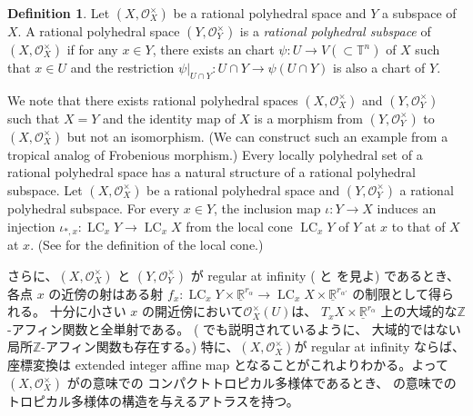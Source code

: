 \documentclass[a4paper,dvipdfmx,reqno,12pt]{amsart}
\theoremstyle{definition}
\newtheorem{definition}[theorem]{Definition}
\newcommand{\opn}[1]{\operatorname{#1}}
\numberwithin{equation}{section}
\begin{document}
\begin{definition}
Let 
$(X,\mathcal{O}_X^{\times})$ be a rational polyhedral space
and $Y$ a subspace of $X$.
A rational polyhedral space $(Y,\mathcal{O}_Y^{\times})$ is 
a \emph{rational polyhedral subspace} of
$(X,\mathcal{O}_X^{\times})$ if 
for any $x\in Y$, there exists an chart
$\psi \colon U \to V (\subset \mathbb{T}^{n})$
of $X$
such that $x\in U$ and the restriction
$\psi|_{U\cap Y}\colon U\cap Y\to 
\psi(U\cap Y)$ is also a chart of $Y$.
\end{definition}
We note that there exists rational polyhedral spaces
$(X,\mathcal{O}_X^{\times})$
and $(Y,\mathcal{O}_Y^{\times})$
such that $X=Y$ and the identity map of $X$ 
is a morphism from $(Y,\mathcal{O}_Y^{\times})$ to
$(X,\mathcal{O}_X^{\times})$ but not an isomorphism.
(We can construct such an example from a tropical analog of
Frobenious morphism.)
Every locally polyhedral set of a rational polyhedral space
\cite[Definition 2.4 (d)]{MR4637248} has a natural 
structure of a rational polyhedral subspace.
Let $(X,\mathcal{O}_X^{\times})$ be a rational
polyhedral space and $(Y,\mathcal{O}_Y^{\times})$
a rational polyhedral subspace.
For every $x\in Y$, 
the inclusion map $\iota\colon Y\to X$ induces
an injection 
$\iota_{*,x}\colon \opn{LC}_x Y\to \opn{LC}_x X$
from the local cone $\opn{LC}_x Y$ of $Y$ at $x$ to 
that of $X$ at $x$.
(See \cite[]{MR4637248} for
the definition of the local cone.)


さらに、$(X,\mathcal{O}_X^{\times})$ と
$(Y,\mathcal{O}_Y^{\times})$ が
regular at infinity 
(\cite[]{MR4637248} と
\cite[Definition 1.2]{MR3330789} を見よ) 
であるとき、各点 $x$ の近傍の射はある射
$f_{x}\colon \opn{LC}_x Y\times 
\underline{\mathbb{R}}^{r_{\alpha}}
\to \opn{LC}_x X\times \underline{\mathbb{R}}^{r_{\alpha'}}$
の制限として得られる。
十分に小さい $x$
の開近傍において$\mathcal{O}_X^{\times}(U)$は、
$T_x X\times \underline{\mathbb{R}}^{r_{\alpha}}$
上の大域的な$\mathbb{Z}$-アフィン関数と全単射である。
(\cite[Example 2.1]{MR4637248} でも説明されているように、
大域的ではない局所$\mathbb{Z}$-アフィン関数も存在する。)
特に、$(X,\mathcal{O}_X^{\times})$が regular at infinity
ならば、座標変換は
extended integer affine map \cite[Definition 2.2]{demedrano2023chern}
となることがこれよりわかる。よって
$(X,\mathcal{O}_X^{\times})$ 
が\cite[Definition 6.1]{gross2019sheaftheoretic}の意味での
コンパクトトロピカル多様体であるとき、
\cite[Definition 2.3]{demedrano2023chern}
の意味でのトロピカル多様体の構造を与えるアトラスを持つ。
\end{document}
